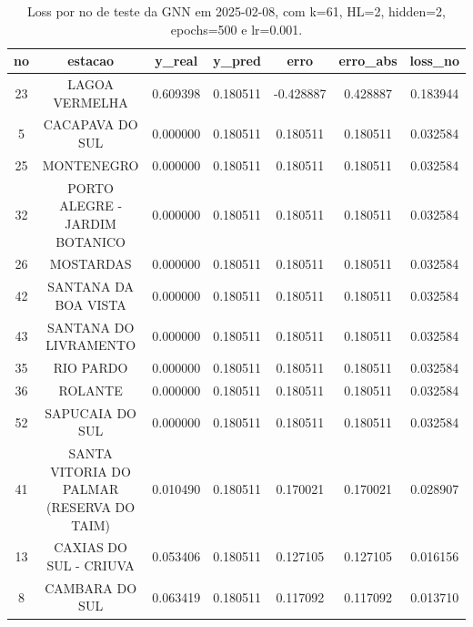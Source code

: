 \begin{table}[h]
\centering
\caption{Loss por no de teste da GNN em 2025-02-08, com k=61, HL=2, hidden=2, epochs=500 e lr=0.001.}
\label{tab:gnn_loss_k61_hl2_h2_e500_d20250208}
\begin{tabular}{ccccccc}
\toprule
no & estacao & y\_real & y\_pred & erro & erro\_abs & loss\_no \\
\midrule
23 & LAGOA VERMELHA & 0.609398 & 0.180511 & -0.428887 & 0.428887 & 0.183944 \\
5 & CACAPAVA DO SUL & 0.000000 & 0.180511 & 0.180511 & 0.180511 & 0.032584 \\
25 & MONTENEGRO & 0.000000 & 0.180511 & 0.180511 & 0.180511 & 0.032584 \\
32 & PORTO ALEGRE - JARDIM BOTANICO & 0.000000 & 0.180511 & 0.180511 & 0.180511 & 0.032584 \\
26 & MOSTARDAS & 0.000000 & 0.180511 & 0.180511 & 0.180511 & 0.032584 \\
42 & SANTANA DA BOA VISTA & 0.000000 & 0.180511 & 0.180511 & 0.180511 & 0.032584 \\
43 & SANTANA DO LIVRAMENTO & 0.000000 & 0.180511 & 0.180511 & 0.180511 & 0.032584 \\
35 & RIO PARDO & 0.000000 & 0.180511 & 0.180511 & 0.180511 & 0.032584 \\
36 & ROLANTE & 0.000000 & 0.180511 & 0.180511 & 0.180511 & 0.032584 \\
52 & SAPUCAIA DO SUL & 0.000000 & 0.180511 & 0.180511 & 0.180511 & 0.032584 \\
41 & SANTA VITORIA DO PALMAR (RESERVA DO TAIM) & 0.010490 & 0.180511 & 0.170021 & 0.170021 & 0.028907 \\
13 & CAXIAS DO SUL - CRIUVA & 0.053406 & 0.180511 & 0.127105 & 0.127105 & 0.016156 \\
8 & CAMBARA DO SUL & 0.063419 & 0.180511 & 0.117092 & 0.117092 & 0.013710 \\
\bottomrule
\end{tabular}
\end{table}
